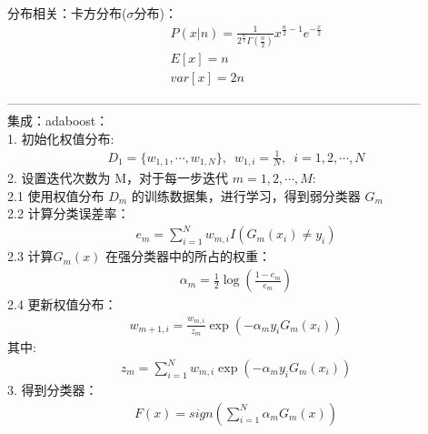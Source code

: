 \documentclass{article}
\begin{document}
\noindent 分布相关：卡方分布($\sigma$分布)：\\
\begin{eqnarray*}
&&P(x|n)=\frac{1}{2^{\frac{n}{2}}\Gamma(\frac{n}{2})}x^{\frac{n}{2}-1}e^{-\frac{x}{2}}\\
&&E[x] = n\\
&&var[x]=2n\\
\end{eqnarray*}
--------------------------------------------------------------------------------------------------\\

\noindent 集成：adaboost：\\
1. 初始化权值分布:
\begin{eqnarray*}
D_{1} = \{w_{1,1}, \cdots, w_{1,N}\},\,\,\, w_{1,i} = \frac{1}{N},\,\,\, i = 1,2,\cdots, N
\end{eqnarray*}
2. 设置迭代次数为 M，对于每一步迭代 $m=1,2,\cdots, M$:	\\
2.1 使用权值分布 $D_{m}$ 的训练数据集，进行学习，得到弱分类器 $G_{m}$\\
2.2 计算分类误差率：
\begin{eqnarray*}
e_{m}=\sum_{i=1}^{N}w_{m,i}I(G_{m}(x_{i})\ne y_{i})
\end{eqnarray*}
2.3 计算$G_{m}(x)$ 在强分类器中的所占的权重：
\begin{eqnarray*}
\alpha_{m} = \frac{1}{2}\log{(\frac{1-e_{m}}{e_{m}})}
\end{eqnarray*}
2.4 更新权值分布：
\begin{eqnarray*}
w_{m+1, i}= \frac{w_{m,i}}{z_{m}}\exp{(-\alpha_{m}y_{i}G_{m}(x_{i}))}
\end{eqnarray*}
其中:
\begin{eqnarray*}
z_{m} = \sum_{i=1}^{N}w_{m,i}\exp{(-\alpha_{m}y_{i}G_{m}(x_{i}))}
\end{eqnarray*}
3. 得到分类器：
\begin{eqnarray*}
F(x) = sign(\sum_{i=1}^{N}\alpha_{m}G_{m}(x))
\end{eqnarray*}
\end{document}
